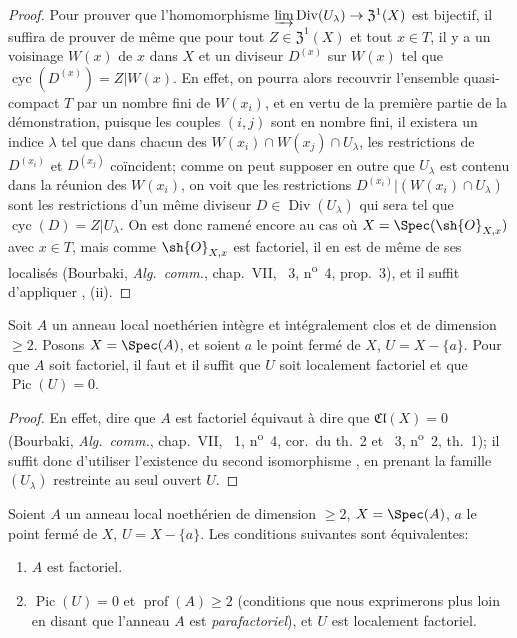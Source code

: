 \begin{proof}
Pour prouver que l'homomorphisme $\varinjlim\operatorname{Div}(U_\lambda)\to\mathfrak{Z}^1(X)$ est bijectif, il suffira de prouver de même que pour tout $Z\in\mathfrak{Z}^1(X)$ et tout $x\in T$, il y a un voisinage $W(x)$ de $x$ dans $X$ et un diviseur $D^{(x)}$ sur $W(x)$ tel que $\operatorname{cyc}(D^{(x)})=Z|W(x)$.
En effet, on pourra alors recouvrir l'ensemble quasi-compact $T$ par un nombre fini de $W(x_i)$, et en vertu de la première partie de la démonstration, puisque les couples $(i,j)$ sont en nombre fini, il existera un indice $\lambda$ tel que dans chacun des $W(x_i)\cap W(x_j)\cap U_\lambda$, les restrictions de $D^{(x_i)}$ et $D^{(x_j)}$ coïncident;
comme on peut supposer en outre que $U_\lambda$ est contenu dans la réunion des $W(x_i)$, on voit que les restrictions $D^{(x_i)}|(W(x_i)\cap U_\lambda)$ sont les restrictions d'un même diviseur $D\in\operatorname{Div}(U_\lambda)$ qui sera tel que $\operatorname{cyc}(D)=Z|U_\lambda$.
On est donc ramené encore au cas où $X=\Spec(\sh{O}_{X,x})$ avec $x\in T$, mais comme $\sh{O}_{X,x}$ est factoriel, il en est de même de ses localisés (Bourbaki, \emph{Alg.\ comm.}, chap.~VII, \textsection~3, n\textsuperscript{o}~4, prop.~3), et il suffit d'appliquer , (ii).
\end{proof}

\begin{corollary}[21.6.13]
\label{IV.21.6.13}
Soit $A$ un anneau local noethérien intègre et intégralement clos et de dimension $\geq2$.
Posons $X=\Spec(A)$, et soient $a$ le point fermé de $X$, $U=X-\{a\}$.
Pour que $A$ soit factoriel, il faut et il suffit que $U$ soit localement factoriel et que $\operatorname{Pic}(U)=0$.
\end{corollary}

\begin{proof}
En effet, dire que $A$ est factoriel équivaut à dire que $\mathfrak{Cl}(X)=0$ (Bourbaki, \emph{Alg.\ comm.}, chap.~VII, \textsection~1, n\textsuperscript{o}~4, cor.\ du th.~2 et \textsection~3, n\textsuperscript{o}~2, th.~1);
il suffit donc d'utiliser l'existence du second isomorphisme , en prenant la famille $(U_\lambda)$ restreinte au seul ouvert $U$.
\end{proof}

\begin{corollary}[21.6.14]
\label{IV.21.6.14}
Soient $A$ un anneau local noethérien de dimension $\geq2$, $X=\Spec(A)$, $a$ le point fermé de $X$, $U=X-\{a\}$.
Les conditions suivantes sont équivalentes:
\begin{enumerate}[label=\emph{\alph*)}]
  \item $A$ est factoriel.
  \item $\operatorname{Pic}(U)=0$ et $\operatorname{prof}(A)\geq2$ (conditions que nous exprimerons plus loin  en disant que l'anneau $A$ est \emph{parafactoriel}), et $U$ est localement factoriel.
\end{enumerate}
\end{corollary}

